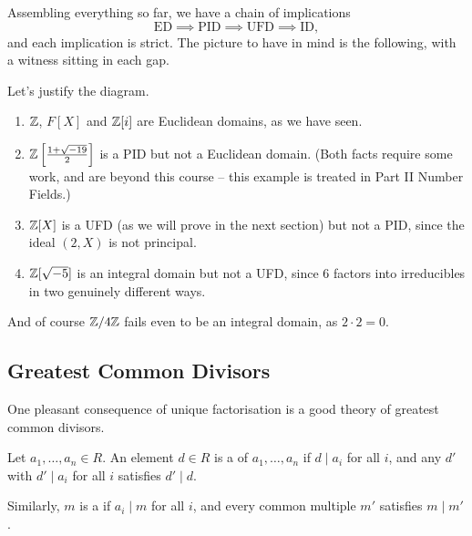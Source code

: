 \documentclass[a4paper]{scrartcl}
\begin{document}
Assembling everything so far, we have a chain of implications
$$
\text{ED} \implies \text{PID} \implies \text{UFD} \implies \text{ID},
$$
and each implication is strict. The picture to have in mind is the following, with a witness sitting in each gap.

\begin{center}
\end{center}

\begin{example}
	Let's justify the diagram.
	\begin{enumerate}[label=(\roman*)]
		\item $\mathbb{Z}$, $F[X]$ and $\mathbb{Z}[i]$ are Euclidean domains, as we have seen.
		\item $\mathbb{Z}\left[\frac{1 + \sqrt{-19}}{2}\right]$ is a PID but not a Euclidean domain. (Both facts require some work, and are beyond this course -- this example is treated in Part II Number Fields.)
		\item $\mathbb{Z}[X]$ is a UFD (as we will prove in the next section) but not a PID, since the ideal $(2, X)$ is not principal.
		\item $\mathbb{Z}[\sqrt{-5}]$ is an integral domain but not a UFD, since $6$ factors into irreducibles in two genuinely different ways.
	\end{enumerate}
	And of course $\mathbb{Z}/4\mathbb{Z}$ fails even to be an integral domain, as $2 \cdot 2 = 0$.
\end{example}

\subsection{Greatest Common Divisors}

One pleasant consequence of unique factorisation is a good theory of greatest common divisors.

\begin{definition}
	Let $a_1, \dots, a_n \in R$. An element $d \in R$ is a  of $a_1, \dots, a_n$ if $d \mid a_i$ for all $i$, and any $d'$ with $d' \mid a_i$ for all $i$ satisfies $d' \mid d$.

	Similarly, $m$ is a  if $a_i \mid m$ for all $i$, and every common multiple $m'$ satisfies $m \mid m'$.
\end{definition}
\end{document}
